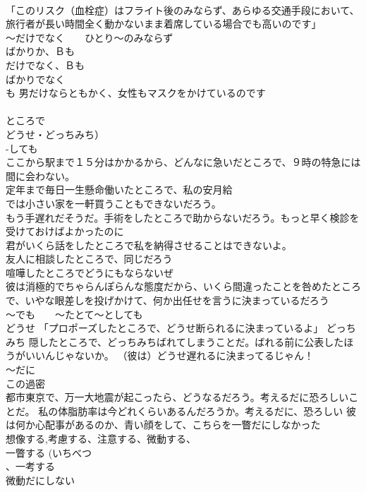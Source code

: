 \documentclass[8pt]{extreport}
\begin{document}
\begin{CJK}{UTF8}{min}
\\	「このリスク（血栓症）はフライト後のみならず、あらゆる交通手段において、旅行者が長い時間全く動かないまま着席している場合でも高いのです」　 
\\	～だけでなく　　ひとり～のみならず 
\\	ばかりか、Ｂも 
\\	だけでなく、Ｂも 
\\	ばかりでなく
\\	も 男だけならともかく、女性もマスクをかけているのです　
\\	[いくら/どんなに]
\\	ところで 
\\	どうせ・どっちみち）	
\\	-しても 
\\	ここから駅まで１５分はかかるから、どんなに急いだところで、９時の特急には間に会わない。 
\\	定年まで毎日一生懸命働いたところで、私の安月給
\\	では小さい家を一軒買うこともできないだろう。 
\\	もう手遅れだそうだ。手術をしたところで助からないだろう。もっと早く検診を受けておけばよかったのに 
\\	君がいくら話をしたところで私を納得させることはできないよ。 
\\	友人に相談したところで、同じだろう 
\\	喧嘩したところでどうにもならないぜ 
\\	彼は消極的でちゃらんぽらんな態度だから、いくら間違ったことを咎めたところで、いやな眼差しを投げかけて、何か出任せを言うに決まっているだろう 
\\	～でも　　～たとて～としても 
\\	どうせ 「プロポーズしたところで、どうせ断られるに決まっているよ」 どっちみち 隠したところで、どっちみちばれてしまうことだ。ばれる前に公表したほうがいいんじゃないか。 （彼は）どうせ遅れるに決まってるじゃん！ 
\\	～だに	
\\	この過密
\\	都市東京で、万一大地震が起こったら、どうなるだろう。考えるだに恐ろしいことだ。 私の体脂肪率は今どれくらいあるんだろうか。考えるだに、恐ろしい 彼は何か心配事があるのか、青い顔をして、こちらを一瞥だにしなかった	
\\	想像する,考慮する、注意する、微動する、
\\	一瞥する (いちべつ 
\\	、一考する
\\	微動だにしない 

\end{CJK}
\end{document}
